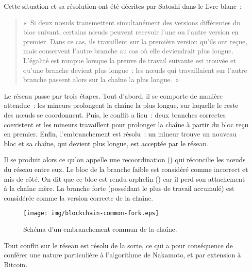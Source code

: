 Cette situation et sa résolution ont été décrites par Satoshi dans le livre blanc~:

\begin{quote}
«~Si deux nœuds transmettent simultanément des versions différentes du bloc suivant, certains nœuds peuvent recevoir l'une ou l'autre version en premier. Dans ce cas, ils travaillent sur la première version qu'ils ont reçue, mais conservent l'autre branche au cas où elle deviendrait plus longue. L'égalité est rompue lorsque la preuve de travail suivante est trouvée et qu'une branche devient plus longue~; les nœuds qui travaillaient sur l'autre branche passent alors sur la chaîne la plus longue.~»
\end{quote}

Le réseau passe par trois étapes. Tout d'abord, il se comporte de manière attendue~: les mineurs prolongent la chaîne la plus longue, sur laquelle le reste des nœuds se coordonnent. Puis, le conflit a lieu~: deux branches correctes coexistent et les mineurs travaillent pour prolonger la chaîne à partir du bloc reçu en premier. Enfin, l'embranchement est résolu~: un mineur trouve un nouveau bloc et sa chaîne, qui devient plus longue, est acceptée par le réseau.

Il se produit alors ce qu'on appelle une recoordination () qui réconcilie les nœuds du réseau entre eux. Le bloc de la branche faible est considéré comme incorrect et mis de côté. On dit que ce bloc est rendu orphelin () car il perd son attachement à la chaîne mère. La branche forte (possédant le plus de travail accumulé) est considérée comme la version correcte de la chaîne.

\begin{figure}[h]
  \centering
  \texttt{[image: img/blockchain-common-fork.eps]}
  \caption{Schéma d'un embranchement commun de la chaîne.}
  \label{fig:blockchain-common-fork}
\end{figure}

Tout conflit sur le réseau est résolu de la sorte, ce qui a pour conséquence de conférer une nature particulière à l'algorithme de Nakamoto, et par extension à Bitcoin.

